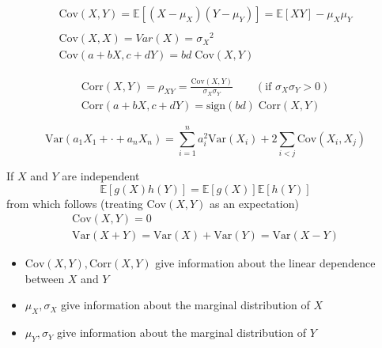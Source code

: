 \newpar{}
\begin{gather*}
    \mathrm{Cov}(X,Y) = \mathbb{E}[(X-\mu_X)(Y-\mu_Y)] = \mathbb{E}[XY]-\mu_X\mu_Y \\
    \\
    \mathrm{Cov}(X,X) = Var(X) = {\sigma_X}^2                                      \\
    \mathrm{Cov}(a+bX,c+dY) = bd\;\mathrm{Cov}(X,Y)
\end{gather*}

\newpar{}
\begin{gather*}
    \mathrm{Corr}(X,Y)        = \rho_{XY} = \frac{\mathrm{Cov}(X,Y)}{\sigma_X\sigma_Y} \qquad (\text{if } \sigma_X\sigma_Y > 0) \\
    \mathrm{Corr}(a+bX,c+dY)  = \mathrm{sign}(bd)\;\mathrm{Corr}(X,Y)
\end{gather*}

\newpar{}
\begin{equation*}
    \mathrm{Var}(a_1 X_1+\cdot+a_n X_n) = \sum_{i=1}^{n}a_i^2\mathrm{Var}(X_i)+2\sum_{i<j}\mathrm{Cov}(X_i,X_j)
\end{equation*}

\newpar{}

If $X$ and $Y$ are independent
\begin{equation*}
    \mathbb{E}[g(X)h(Y)] = \mathbb{E}[g(X)]\mathbb{E}[h(Y)]
\end{equation*}
from which follows (treating $\mathrm{Cov}(X,Y)$ as an expectation)
\begin{gather*}
    \mathrm{Cov}(X,Y) = 0 \\
    \mathrm{Var}(X+Y) = \mathrm{Var}(X) + \mathrm{Var}(Y) = \mathrm{Var}(X-Y)
\end{gather*}

\newpar{}
\begin{itemize}
    \item $\mathrm{Cov}(X,Y), \mathrm{Corr}(X,Y)$ give information about the linear dependence between $X$ and $Y$
    \item $\mu_X, \sigma_X$ give information about the marginal distribution of $X$
    \item $\mu_Y, \sigma_Y$ give information about the marginal distribution of $Y$
\end{itemize}

